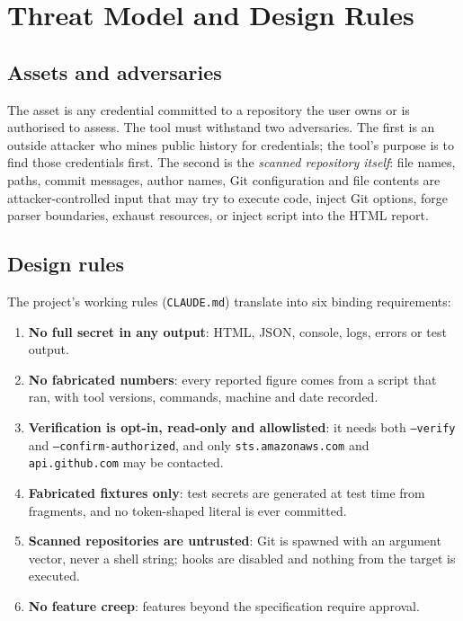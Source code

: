 \documentclass[conference]{IEEEtran}
\newcommand{\code}[1]{\texttt{#1}}
\begin{document}
\section{Threat Model and Design Rules}\label{sec:threat}

\subsection{Assets and adversaries}
The asset is any credential committed to a repository the user owns or is authorised to assess.
The tool must withstand two adversaries. The first is an outside attacker who mines public
history for credentials; the tool's purpose is to find those credentials first. The second is the
\emph{scanned repository itself}: file names, paths, commit messages, author names, Git
configuration and file contents are attacker-controlled input that may try to execute code,
inject Git options, forge parser boundaries, exhaust resources, or inject script into the HTML
report.

\subsection{Design rules}
The project's working rules (\code{CLAUDE.md}) translate into six binding requirements:
\begin{enumerate}
\item[R1] \textbf{No full secret in any output}: HTML, JSON, console, logs, errors or test output.
\item[R2] \textbf{No fabricated numbers}: every reported figure comes from a script that ran, with
  tool versions, commands, machine and date recorded.
\item[R3] \textbf{Verification is opt-in, read-only and allowlisted}: it needs both
  \code{--verify} and \code{--confirm-authorized}, and only \code{sts.amazonaws.com} and
  \code{api.github.com} may be contacted.
\item[R4] \textbf{Fabricated fixtures only}: test secrets are generated at test time from
  fragments, and no token-shaped literal is ever committed.
\item[R5] \textbf{Scanned repositories are untrusted}: Git is spawned with an argument vector,
  never a shell string; hooks are disabled and nothing from the target is executed.
\item[R6] \textbf{No feature creep}: features beyond the specification require approval.
\end{enumerate}
\end{document}
